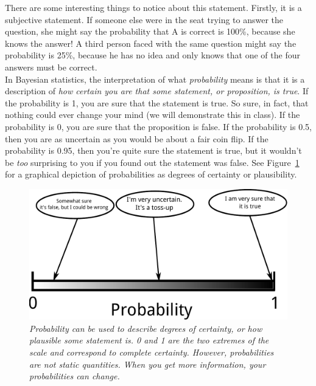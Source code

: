 There are some interesting
things to notice about this statement. Firstly, it is a subjective statement.
If someone else were in the seat trying to answer the question, she might say
the probability that A is correct is 100\%, because she knows the answer!
A third person faced with the same question might say the probability is 25\%,
because he has no idea and only knows that one of the four answers
must be correct.\\

In Bayesian statistics, the interpretation of what {\it probability} means is
that it is a description of {\it how certain you are that some statement, or
proposition, is true}.
If the probability is 1, you are sure that the statement is true. So sure, in
fact, that nothing could ever change your mind (we will demonstrate this in class).
If the probability is 0, you
are sure that the proposition is false. If the probability is 0.5, then you
are as uncertain as you would be about a fair coin flip. If the probability is
0.95, then you're quite sure the statement is true, but it wouldn't be {\it too}
surprising to you if you found out the statement was false. See
Figure~\ref{fig:probability_scale} for a graphical depiction of probabilities
as degrees of certainty or plausibility.\\

\begin{figure}[!ht]
\begin{center}
\includegraphics[scale=0.6]{Figures/probability_scale.pdf}
\caption{\it Probability can be used to describe degrees of certainty, or
how plausible some statement is. 0 and 1 are the two extremes of the scale
and correspond to complete certainty. However, probabilities are not static
quantities. When you get more information, your probabilities can change.
\label{fig:probability_scale}}
\end{center}
\end{figure}

